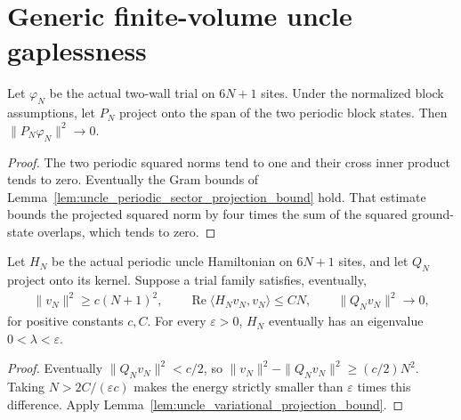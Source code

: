 \section{Generic finite-volume uncle gaplessness}
\label{sec:uncle_finite_gaplessness}

\begin{lemma}
    \label{lem:uncle_trial_ground_projection_decay}
    \leanok
    Let $\varphi_N$ be the actual two-wall trial on $6N+1$ sites.
    Under the normalized block assumptions, let $P_N$ project onto the
    span of the two periodic block states. Then
    $\|P_N\varphi_N\|^2\longrightarrow0$.
\end{lemma}
\begin{proof}
    \leanok
    The two periodic squared norms tend to one and their cross inner
    product tends to zero. Eventually the Gram bounds of
    Lemma~\ref{lem:uncle_periodic_sector_projection_bound} hold.
    That estimate bounds the projected squared norm by four times
    the sum of the squared ground-state overlaps, which tends to zero.
\end{proof}

\begin{lemma}
    \label{lem:uncle_asymptotic_variational_inequality}
    \leanok
    Let $H_N$ be the actual periodic uncle Hamiltonian on $6N+1$
    sites, and let $Q_N$ project onto its kernel. Suppose a trial family
    satisfies, eventually,
    \begin{align}
        \|v_N\|^2\ge c(N+1)^2,\qquad
        \operatorname{Re}\langle H_Nv_N,v_N\rangle\le CN,
        \qquad \|Q_Nv_N\|^2\longrightarrow0,
    \end{align}
    for positive constants $c,C$. For every $\varepsilon>0$,
    $H_N$ eventually has an eigenvalue $0<\lambda<\varepsilon$.
\end{lemma}
\begin{proof}
    \leanok
    Eventually $\|Q_Nv_N\|^2<c/2$, so
    $\|v_N\|^2-\|Q_Nv_N\|^2\ge(c/2)N^2$.
    Taking $N>2C/(\varepsilon c)$ makes the energy strictly smaller
    than $\varepsilon$ times this difference. Apply
    Lemma~\ref{lem:uncle_variational_projection_bound}.
\end{proof}

